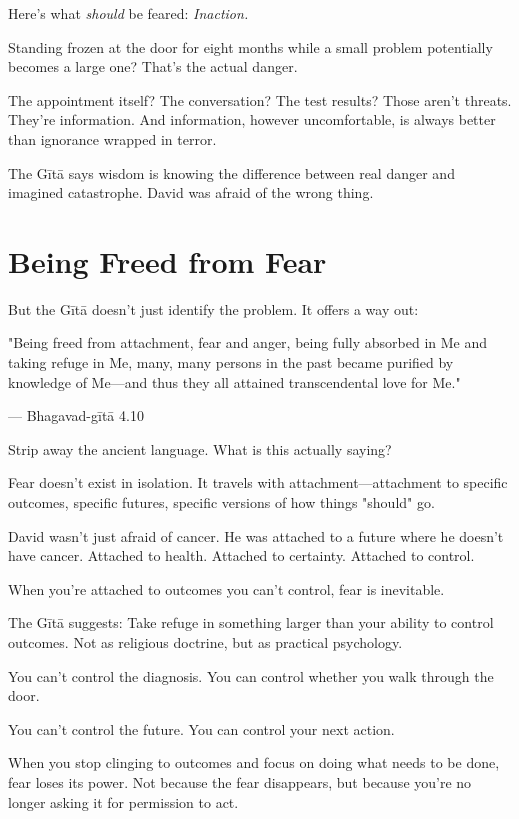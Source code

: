 \documentclass[11pt,twoside]{book}
\begin{document}
Here's what \textit{should} be feared: \textit{Inaction.}

Standing frozen at the door for eight months while a small problem potentially becomes a large one? That's the actual danger.

The appointment itself? The conversation? The test results? Those aren't threats. They're information. And information, however uncomfortable, is always better than ignorance wrapped in terror.

The Gītā says wisdom is knowing the difference between real danger and imagined catastrophe. David was afraid of the wrong thing.

\section*{Being Freed from Fear}

But the Gītā doesn't just identify the problem. It offers a way out:

\begin{pullquote}
"Being freed from attachment, fear and anger, being fully absorbed in Me and taking refuge in Me, many, many persons in the past became purified by knowledge of Me—and thus they all attained transcendental love for Me."

--- Bhagavad-gītā 4.10
\end{pullquote}

Strip away the ancient language. What is this actually saying?

Fear doesn't exist in isolation. It travels with attachment—attachment to specific outcomes, specific futures, specific versions of how things "should" go.

David wasn't just afraid of cancer. He was attached to a future where he doesn't have cancer. Attached to health. Attached to certainty. Attached to control.

When you're attached to outcomes you can't control, fear is inevitable.

The Gītā suggests: Take refuge in something larger than your ability to control outcomes. Not as religious doctrine, but as practical psychology.

You can't control the diagnosis. You can control whether you walk through the door.

You can't control the future. You can control your next action.

When you stop clinging to outcomes and focus on doing what needs to be done, fear loses its power. Not because the fear disappears, but because you're no longer asking it for permission to act.
\end{document}
